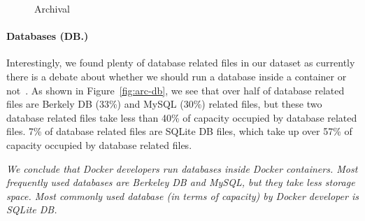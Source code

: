 \begin{figure}
	\centering
	\caption{Archival}
	\label{fig:arc-doc}
\end{figure} 

\paragraph{Databases (DB.)}

Interestingly, we found plenty of database related files in our dataset as currently there is a debate about whether we should run a database inside a container or not~\cite{xxx}. As shown in Figure~\ref{fig:arc-db}, we see that over half of database related files are Berkely DB (33\%) and MySQL (30\%) related files, but these two database related files take less than 40\% of capacity occupied by database related files. 7\% of database related files are SQLite DB files, which take up over 57\% of capacity occupied by database related files. 

\textit{We conclude that Docker developers run databases inside Docker containers. Most frequently used databases are Berkeley DB and MySQL, but they take less storage space. Most commonly used database (in terms of capacity) by Docker developer is SQLite DB.}

